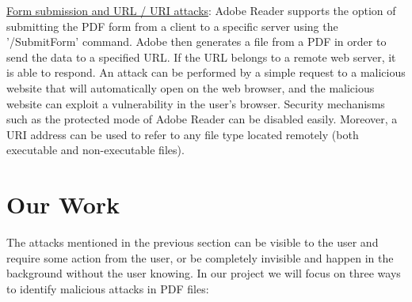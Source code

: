 \documentclass{article}
\begin{document}
\indent \underline{Form submission and URL / URI attacks}: Adobe Reader supports the option of submitting the PDF form from a client to a specific server using the '/SubmitForm’ command. Adobe then generates a file from a PDF in order to send the data to a specified URL. If the URL belongs to a remote web server, it is able to respond. An attack can be performed by a simple request to a malicious website that will automatically open on the web browser, and the malicious website can exploit a vulnerability in the user's browser. Security mechanisms such as the protected mode of Adobe Reader can be disabled easily. Moreover, a URI address can be used to refer to any file type located remotely (both executable and non-executable files).

\section{Our Work}
\indent The attacks mentioned in the previous section can be visible to the user and require some action from the user, or be completely invisible and happen in the background without the user knowing. In our project we will focus on three ways to identify malicious attacks in PDF files:
\end{document}
